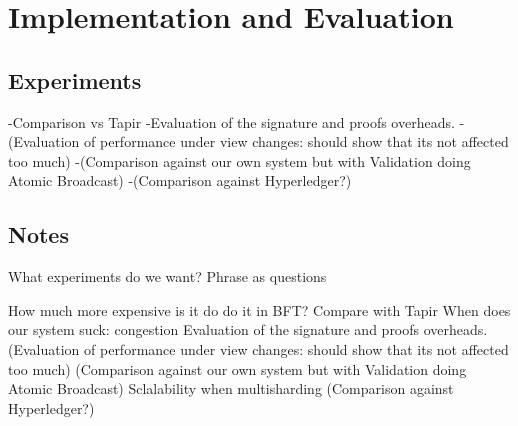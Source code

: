 \section{Implementation and Evaluation}

\subsection{Experiments}
-Comparison vs Tapir
-Evaluation of the signature and proofs overheads.
-(Evaluation of performance under view changes: should show that its not affected too much)
-(Comparison against our own system but with Validation doing Atomic Broadcast)
-(Comparison against Hyperledger?)


\subsection{Notes}
What experiments do we want? Phrase as questions


How much more expensive is it do do it in BFT? Compare with Tapir
When does our system suck: congestion
Evaluation of the signature and proofs overheads.
(Evaluation of performance under view changes: should show that its not affected too much)
(Comparison against our own system but with Validation doing Atomic Broadcast)
Sclalability when multisharding
(Comparison against Hyperledger?)

